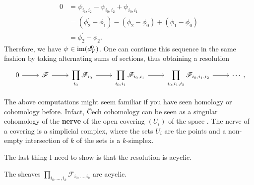 \begin{align*}
  0 &= \psi_{i_{1},i_{2}}-\psi_{i_{0},i_{2}}+\psi_{i_{0},i_{1}} \\
    &= (\phi_{2}^{\prime}-\phi_{1})-(\phi_{2}-\phi_{0})+(\phi_{1}-\phi_{0}) \\
    &= \phi_{2}^{\prime}-\phi_{2}.
\end{align*}
Therefore, we have $\psi\in\operatorname{im}(d_{V}^{0})$. One can continue this sequence
in the same fashion by taking alternating sums of sections, thus obtaining
a resolution
\[\begin{tikzcd}
    0\rar & \mathscr{F}\rar
    & \displaystyle\prod_{i_{0}}\mathscr{F}_{i_{0}}\rar
    & \displaystyle\prod_{i_{0},i_{1}}\mathscr{F}_{i_{0},i_{1}}\rar
    & \displaystyle\prod_{i_{0},i_{1},i_{2}}\mathscr{F}_{i_{0},i_{1},i_{2}}\rar
    & \cdots
  \end{tikzcd},\]
\begin{rem}
  The above computations might seem familiar if you have seen homology
  or cohomology before. Infact, \v Cech cohomology can be seen as a singular
  cohomology of the \textbf{nerve} of the open covering $(U_{i})$ of the space
  \cite{hatcher}. The nerve of a covering is a simplicial complex, where the
  sets $U_{i}$ are the points and a non-empty intersection of $k$ of the sets
  is a $k$-simplex.
\end{rem}
The last thing I need to show is that the resolution is acyclic.
\begin{lemm}
  The sheaves
  $\displaystyle\prod_{i_{0},\ldots,i_{k}}\mathscr{F}_{i_{0},\ldots,i_{k}}$ are
  acyclic.
\end{lemm}
